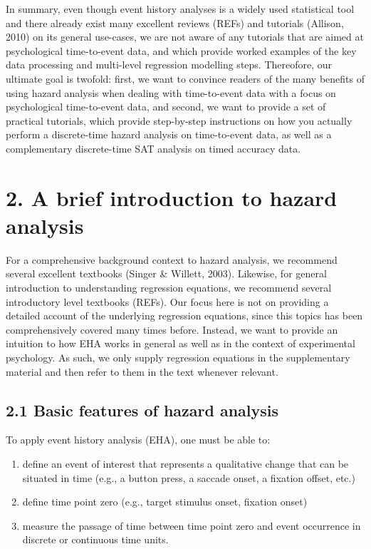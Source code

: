 \documentclass[
  man,floatsintext]{apa6}
\begin{document}
In summary, even though event history analyses is a widely used statistical tool and there already exist many excellent reviews (REFs) and tutorials (Allison, 2010) on its general use-cases, we are not aware of any tutorials that are aimed at psychological time-to-event data, and which provide worked examples of the key data processing and multi-level regression modelling steps.
Thereofore, our ultimate goal is twofold: first, we want to convince readers of the many benefits of using hazard analysis when dealing with time-to-event data with a focus on psychological time-to-event data, and second, we want to provide a set of practical tutorials, which provide step-by-step instructions on how you actually perform a discrete-time hazard analysis on time-to-event data, as well as a complementary discrete-time SAT analysis on timed accuracy data.

\section{2. A brief introduction to hazard analysis}\label{a-brief-introduction-to-hazard-analysis}

For a comprehensive background context to hazard analysis, we recommend several excellent textbooks (Singer \& Willett, 2003). Likewise, for general introduction to understanding regression equations, we recommend several introductory level textbooks (REFs). Our focus here is not on providing a detailed account of the underlying regression equations, since this topics has been comprehensively covered many times before. Instead, we want to provide an intuition to how EHA works in general as well as in the context of experimental psychology. As such, we only supply regression equations in the supplementary material and then refer to them in the text whenever relevant.

\subsection{2.1 Basic features of hazard analysis}\label{basic-features-of-hazard-analysis}

To apply event history analysis (EHA), one must be able to:

\begin{enumerate}
\def\labelenumi{\arabic{enumi}.}
\item
  define an event of interest that represents a qualitative change that can be situated in time (e.g., a button press, a saccade onset, a fixation offset, etc.)
\item
  define time point zero (e.g., target stimulus onset, fixation onset)
\item
  measure the passage of time between time point zero and event occurrence in discrete or continuous time units.
\end{enumerate}
\end{document}
